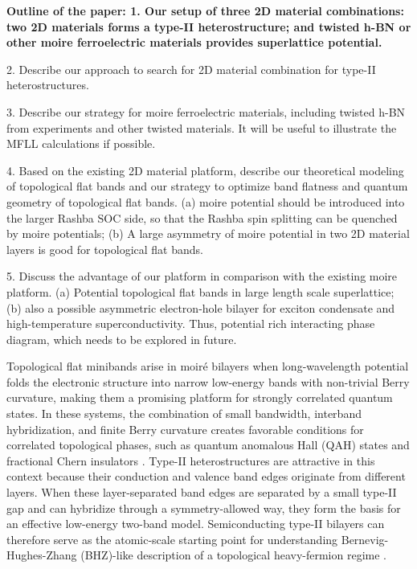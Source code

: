 \documentclass[aps, preprint, prb,]{revtex4-2}
\newcommand{\addCXL}[1]{{\bf \color{red} #1}}
\begin{document}
\addCXL{Outline of the paper: 
1. Our setup of three 2D material combinations: two 2D materials forms a type-II heterostructure; and twisted h-BN or other moire ferroelectric materials provides superlattice potential. 

2. Describe our approach to search for 2D material combination for type-II heterostructures. 

3. Describe our strategy for moire ferroelectric materials, including twisted h-BN from experiments and other twisted materials. It will be useful to illustrate the MFLL calculations if possible. 

4. Based on the existing 2D material platform, describe our theoretical modeling of topological flat bands and our strategy to optimize band flatness and quantum geometry of topological flat bands. (a) moire potential should be introduced into the larger Rashba SOC side, so that the Rashba spin splitting can be quenched by moire potentials; (b) A large asymmetry of moire potential in two 2D material layers is good for topological flat bands. 

5. Discuss the advantage of our platform in comparison with the existing moire platform. (a) Potential topological flat bands in large length scale superlattice; (b) also a possible asymmetric electron-hole bilayer for exciton condensate and high-temperature superconductivity. Thus, potential rich interacting phase diagram, which needs to be explored in future. 
}

Topological flat minibands arise in moir\'e bilayers when long-wavelength potential folds the electronic structure into narrow low-energy bands with non-trivial Berry curvature, making them a promising platform for strongly correlated quantum states. In these systems, the combination of small bandwidth, interband hybridization, and finite Berry curvature creates favorable conditions for correlated topological phases, such as quantum anomalous Hall (QAH) states and fractional Chern insulators \cite{Bistritzer2011, Balents2020, Andrei2020, Liu2025QuantumGeometry, Yu2025QuantumGeometry, Crepel2025PRX, Angeli2021gamma}. Type-II heterostructures are attractive in this context because their conduction and valence band edges originate from different layers. When these layer-separated band edges are separated by a small type-II gap and can hybridize through a symmetry-allowed way, they form the basis for an effective low-energy two-band model. Semiconducting type-II bilayers can therefore serve as the atomic-scale starting point for understanding Bernevig-Hughes-Zhang (BHZ)-like description of a topological heavy-fermion regime \cite{Bernevig2006QSH, Liu2025IdealTHF, Song2022graphenethf}.
\end{document}
